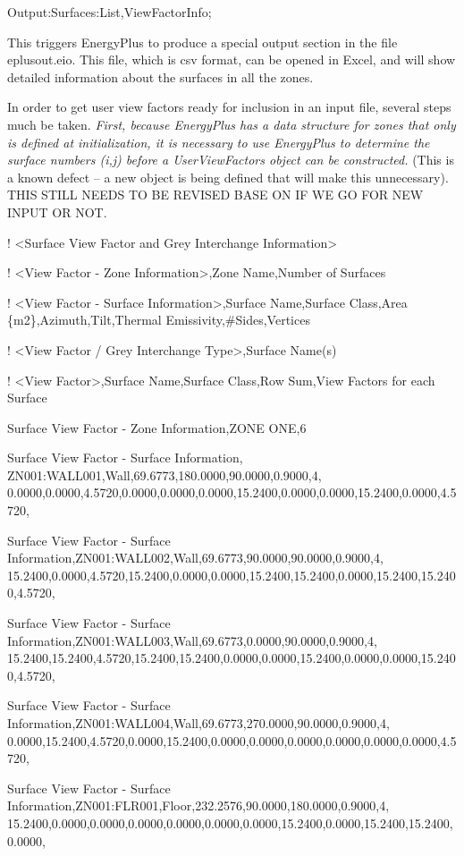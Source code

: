 Output:Surfaces:List,ViewFactorInfo;

This triggers EnergyPlus to produce a special output section in the file eplusout.eio. This file, which is csv format, can be opened in Excel, and will show detailed information about the surfaces in all the zones.

In order to get user view factors ready for inclusion in an input file, several steps much be taken. \emph{First, because EnergyPlus has a data structure for zones that only is defined at initialization, it is necessary to use EnergyPlus to determine the surface numbers (i,j) before a UserViewFactors object can be constructed.} (This is a known defect -- a new object is being defined that will make this unnecessary). THIS STILL NEEDS TO BE REVISED BASE ON IF WE GO FOR NEW INPUT OR NOT.

! \textless{}Surface View Factor and Grey Interchange Information\textgreater{}

! \textless{}View Factor - Zone Information\textgreater{},Zone Name,Number of Surfaces

! \textless{}View Factor - Surface Information\textgreater{},Surface Name,Surface Class,Area \{m2\},Azimuth,Tilt,Thermal Emissivity,\#Sides,Vertices

! \textless{}View Factor / Grey Interchange Type\textgreater{},Surface Name(s)

! \textless{}View Factor\textgreater{},Surface Name,Surface Class,Row Sum,View Factors for each Surface

Surface View Factor - Zone Information,ZONE ONE,6

Surface View Factor - Surface Information, ZN001:WALL001,Wall,69.6773,180.0000,90.0000,0.9000,4, 0.0000,0.0000,4.5720,0.0000,0.0000,0.0000,15.2400,0.0000,0.0000,15.2400,0.0000,4.5720,

Surface View Factor - Surface Information,ZN001:WALL002,Wall,69.6773,90.0000,90.0000,0.9000,4, 15.2400,0.0000,4.5720,15.2400,0.0000,0.0000,15.2400,15.2400,0.0000,15.2400,15.2400,4.5720,

Surface View Factor - Surface Information,ZN001:WALL003,Wall,69.6773,0.0000,90.0000,0.9000,4, 15.2400,15.2400,4.5720,15.2400,15.2400,0.0000,0.0000,15.2400,0.0000,0.0000,15.2400,4.5720,

Surface View Factor - Surface Information,ZN001:WALL004,Wall,69.6773,270.0000,90.0000,0.9000,4, 0.0000,15.2400,4.5720,0.0000,15.2400,0.0000,0.0000,0.0000,0.0000,0.0000,0.0000,4.5720,

Surface View Factor - Surface Information,ZN001:FLR001,Floor,232.2576,90.0000,180.0000,0.9000,4, 15.2400,0.0000,0.0000,0.0000,0.0000,0.0000,0.0000,15.2400,0.0000,15.2400,15.2400,0.0000,


